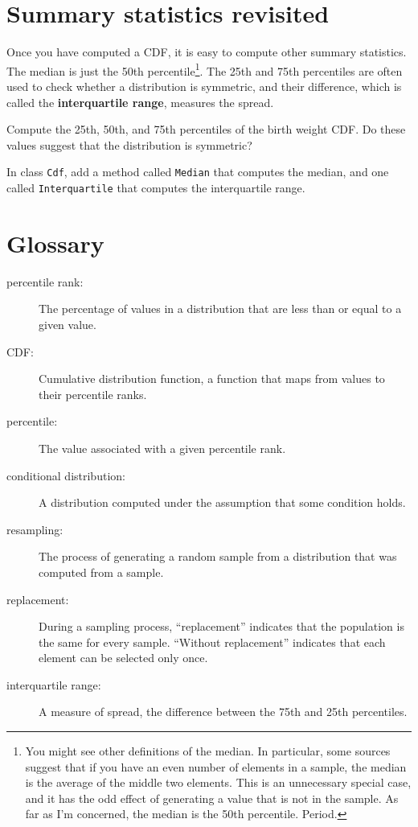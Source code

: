 \documentclass[12pt]{book}
\begin{document}
\section{Summary statistics revisited}

Once you have computed a CDF, it is easy to compute other summary
statistics.  The median is just the 50th percentile\footnote{You might
see other definitions of the median.  In particular,
some sources suggest that if you have an even number of elements in
a sample, the median is the average of the middle two elements.
This is an unnecessary special case, and it has the odd effect of
generating a value that is not in the sample.  As far
as I'm concerned, the median is the 50th percentile.  Period.}.
The 25th and 75th percentiles are often used to check whether
a distribution is symmetric, and their difference, which is called
the {\bf interquartile range}, measures the spread.

\begin{ex}
Compute the 25th, 50th, and 75th percentiles of the birth weight
CDF.  Do these values suggest that the distribution is symmetric?

In class {\tt Cdf}, add a method called {\tt Median} that computes the
median, and one called {\tt Interquartile} that computes
the interquartile range.
\end{ex}


\section{Glossary}

\begin{description}

\item[percentile rank:] The percentage of values in a distribution that are
less than or equal to a given value.

\item[CDF:] Cumulative distribution function, a function that maps
  from values to their percentile ranks.

\item[percentile:] The value associated with a given percentile rank.

\item[conditional distribution:] A distribution computed under the assumption
that some condition holds.

\item[resampling:] The process of generating a random sample from a
distribution that was computed from a sample.

\item[replacement:] During a sampling process, ``replacement'' indicates
that the population is the same for every sample.  ``Without replacement''
indicates that each element can be selected only once.

\item[interquartile range:] A measure of spread, the difference between
the 75th and 25th percentiles.

\end{description}
\end{document}
